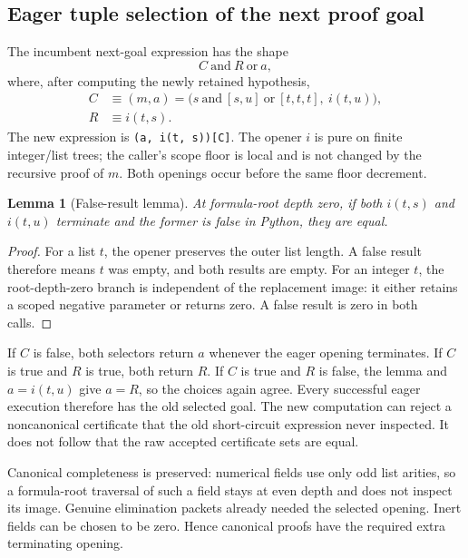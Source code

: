 \documentclass[11pt]{article}
\newtheorem{lemma}[theorem]{Lemma}
\theoremstyle{definition}\newtheorem{definition}[theorem]{Definition}
\theoremstyle{remark}\newtheorem{remark}[theorem]{Remark}
\newcommand{\file}[1]{\nolinkurl{#1}}
\begin{document}
\subsection{Eager tuple selection of the next proof goal}

The incumbent next-goal expression has the shape
\[
                     C\ \mathrm{and}\ R\ \mathrm{or}\ a,
\]
where, after computing the newly retained hypothesis,
\begin{align*}
 C&\equiv (m,a)=
 \bigl(s\ \mathrm{and}\ [s,u]\ \mathrm{or}\ [t,t,t],\ i(t,u)\bigr),\\
 R&\equiv i(t,s).
\end{align*}
The new expression is \file{(a, i(t, s))[C]}. The opener \(i\) is pure
on finite integer/list trees; the caller's scope floor is local and is
not changed by the recursive proof of \(m\). Both openings occur before
the same floor decrement.

\begin{lemma}[False-result lemma]
At formula-root depth zero, if both \(i(t,s)\) and \(i(t,u)\) terminate
and the former is false in Python, they are equal.
\end{lemma}
\begin{proof}
For a list \(t\), the opener preserves the outer list length. A false
result therefore means \(t\) was empty, and both results are empty.
For an integer \(t\), the root-depth-zero branch is independent of the
replacement image: it either retains a scoped negative parameter or
returns zero. A false result is zero in both calls.
\end{proof}

If \(C\) is false, both selectors return \(a\) whenever the eager opening
terminates. If \(C\) is true and \(R\) is true, both return \(R\).
If \(C\) is true and \(R\) is false, the lemma and
\(a=i(t,u)\) give \(a=R\), so the choices again agree.
Every successful eager execution therefore has the old selected goal.
The new computation can reject a noncanonical certificate that the old
short-circuit expression never inspected. It does not follow that the
raw accepted certificate sets are equal.

Canonical completeness is preserved: numerical fields use only odd
list arities, so a formula-root traversal of such a field stays at even
depth and does not inspect its image. Genuine elimination packets already
needed the selected opening. Inert fields can be chosen to be zero.
Hence canonical proofs have the required extra terminating opening.
\end{document}
